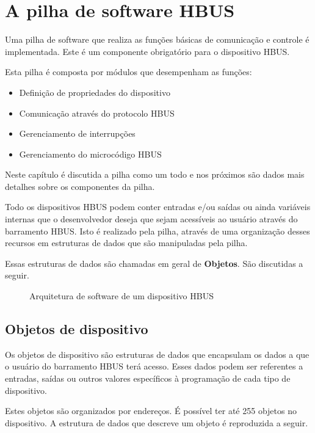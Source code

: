 \documentclass[11pt]{report}
\begin{document}
\chapter{A pilha de software HBUS}

Uma pilha de software que realiza as funções básicas de comunicação e controle é implementada. Este é um componente obrigatório para o dispositivo HBUS.

Esta pilha é composta por módulos que desempenham as funções:

\begin{itemize}

\item Definição de propriedades do dispositivo
\item Comunicação através do protocolo HBUS
\item Gerenciamento de interrupções
\item Gerenciamento do microcódigo HBUS

\end{itemize}

Neste capítulo é discutida a pilha como um todo e nos próximos são dados mais detalhes sobre os componentes da pilha.

Todo os dispositivos HBUS podem conter entradas e/ou saídas ou ainda variáveis internas que o desenvolvedor deseja que sejam acessíveis ao usuário através do barramento HBUS. Isto é realizado pela pilha, através de uma organização desses recursos em estruturas de dados que são manipuladas pela pilha.

Essas estruturas de dados são chamadas em geral de \textbf{Objetos}. São discutidas a seguir.

\begin{figure}[h]
\centering

\caption{Arquitetura de software de um dispositivo HBUS}
\end{figure}

\section{Objetos de dispositivo}

Os objetos de dispositivo são estruturas de dados que encapsulam os dados a que o usuário do barramento HBUS terá acesso. Esses dados podem ser referentes a entradas, saídas ou outros valores específicos à programação de cada tipo de dispositivo.

Estes objetos são organizados por endereços. É possível ter até 255 objetos no dispositivo. A estrutura de dados que descreve um objeto é reproduzida a seguir.
\end{document}
